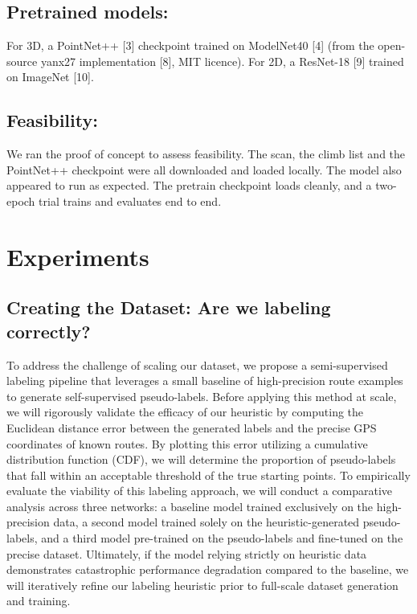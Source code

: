 \documentclass{mva2011}
\begin{document}
\subsection{Pretrained models:}
    For 3D, a PointNet++ [3] checkpoint trained on ModelNet40 [4] (from the open-source yanx27 implementation [8], MIT licence). For 2D, a ResNet-18 [9] trained on ImageNet [10].

\subsection{Feasibility:} 
    We ran the proof of concept to assess feasibility. The scan, the climb list and the PointNet++ checkpoint were all downloaded and loaded locally. The model also appeared to run as expected. The pretrain checkpoint loads cleanly, and a two-epoch trial trains and evaluates end to end.

\section{Experiments}
    
\subsection{Creating the Dataset: Are we labeling correctly?}
To address the challenge of scaling our dataset, we propose a semi-supervised labeling pipeline that leverages a small baseline of high-precision route examples to generate self-supervised pseudo-labels. Before applying this method at scale, we will rigorously validate the efficacy of our heuristic by computing the Euclidean distance error between the generated labels and the precise GPS coordinates of known routes. By plotting this error utilizing a cumulative distribution function (CDF), we will determine the proportion of pseudo-labels that fall within an acceptable threshold of the true starting points. To empirically evaluate the viability of this labeling approach, we will conduct a comparative analysis across three networks: a baseline model trained exclusively on the high-precision data, a second model trained solely on the heuristic-generated pseudo-labels, and a third model pre-trained on the pseudo-labels and fine-tuned on the precise dataset. Ultimately, if the model relying strictly on heuristic data demonstrates catastrophic performance degradation compared to the baseline, we will iteratively refine our labeling heuristic prior to full-scale dataset generation and training.
\end{document}
